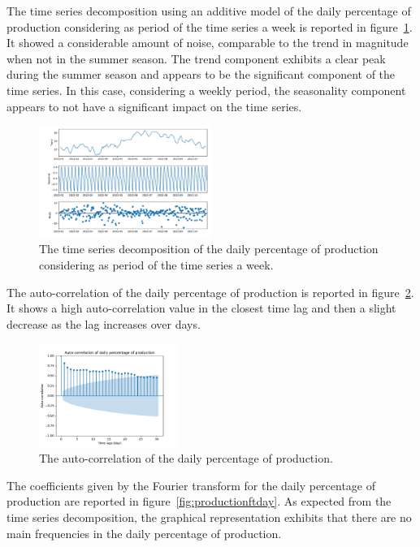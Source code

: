 The time series decomposition using an additive model of the daily percentage of production considering as period of the time series a week is reported in figure~\ref{fig:productiondecompositionday}.
It showed a considerable amount of noise, comparable to the trend in magnitude when not in the summer season.
The trend component exhibits a clear peak during the summer season and appears to be the significant component of the time series.
In this case, considering a weekly period, the seasonality component appears to not have a significant impact on the time series.

\begin{figure}[H]
\centering
\includegraphics[width=0.5\textwidth]{images/production/daily_aggregated_decomposition}
\caption{The time series decomposition of the daily percentage of production considering as period of the time series a week.}
\label{fig:productiondecompositionday}
\end{figure}

The auto-correlation of the daily percentage of production is reported in figure~\ref{fig:productioncorrelationday}.
It shows a high auto-correlation value in the closest time lag and then a slight decrease as the lag increases over days.

\begin{figure}[H]
\centering
\includegraphics[width=0.4\textwidth]{images/production/daily_aggregated_correlation}
\caption{The auto-correlation of the daily percentage of production.}
\label{fig:productioncorrelationday}
\end{figure}

The coefficients given by the Fourier transform for the daily percentage of production are reported in figure~\ref{fig:productionftday}.
As expected from the time series decomposition, the graphical representation exhibits that there are no main frequencies in the daily percentage of production.


